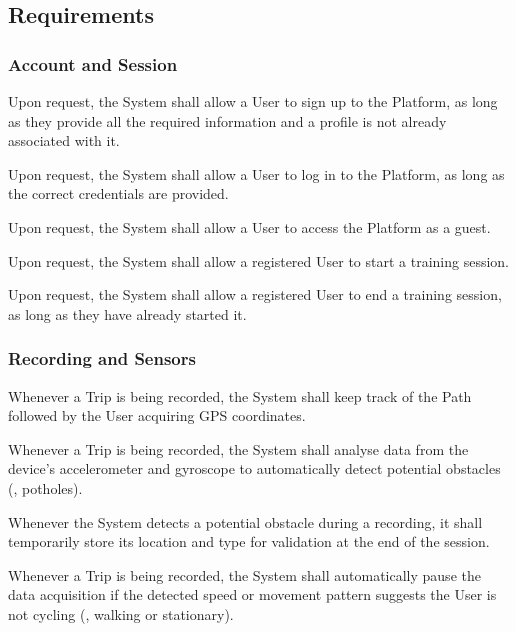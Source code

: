 \subsection{Requirements}

\subsubsection*{Account and Session}
\begin{rlist}
    \item Upon request, the System shall allow a User to sign up to the Platform, as long as they provide all the required information and a profile is not already associated with it.
    \item Upon request, the System shall allow a User to log in to the Platform, as long as the correct credentials are provided.
    \item Upon request, the System shall allow a User to access the Platform as a guest.
    \item Upon request, the System shall allow a registered User to start a training session.
    \item Upon request, the System shall allow a registered User to end a training session, as long as they have already started it.
\end{rlist}

\subsubsection*{Recording and Sensors}
\begin{rlist}[resume]
    \item Whenever a Trip is being recorded, the System shall keep track of the Path followed by the User acquiring GPS coordinates.
    \item Whenever a Trip is being recorded, the System shall analyse data from the device's accelerometer and gyroscope to automatically detect potential obstacles (\eg, potholes).
    \item Whenever the System detects a potential obstacle during a recording, it shall temporarily store its location and type for validation at the end of the session.
    \item Whenever a Trip is being recorded, the System shall automatically pause the data acquisition if the detected speed or movement pattern suggests the User is not cycling (\eg, walking or stationary).
\end{rlist}

